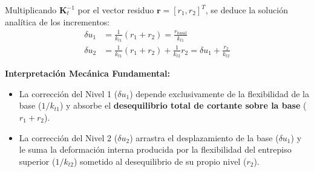\documentclass[11pt,letterpaper]{article}
\begin{document}
Multiplicando $\mathbf{K}_t^{-1}$ por el vector residuo $\mathbf{r} = [r_1, r_2]^T$, se deduce la solución analítica de los incrementos:
\begin{align}
    \delta u_1 &= \frac{1}{k_{t1}} (r_1 + r_2) = \frac{r_{\text{basal}}}{k_{t1}} \label{eq:du1_physical} \\[0.25cm]
    \delta u_2 &= \frac{1}{k_{t1}} (r_1 + r_2) + \frac{1}{k_{t2}} r_2 = \delta u_1 + \frac{r_2}{k_{t2}} \label{eq:du2_physical}
\end{align}

\noindent\textbf{Interpretación Mecánica Fundamental:}
\begin{itemize}
    \item La corrección del Nivel 1 ($\delta u_1$) depende exclusivamente de la flexibilidad de la base ($1/k_{t1}$) y absorbe el \textbf{desequilibrio total de cortante sobre la base} ($r_1 + r_2$).
    \item La corrección del Nivel 2 ($\delta u_2$) arrastra el desplazamiento de la base ($\delta u_1$) y le suma la deformación interna producida por la flexibilidad del entrepiso superior ($1/k_{t2}$) sometido al desequilibrio de su propio nivel ($r_2$).
\end{itemize}
\end{document}
